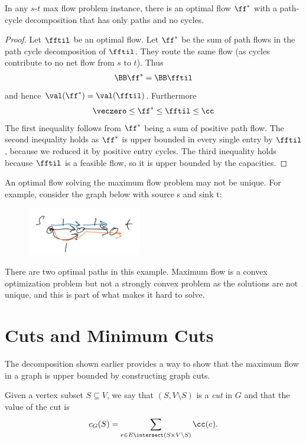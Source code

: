 \begin{lemma}
In any $s$-$t$ max flow problem instance, there is an optimal flow \(\ff^*\) with a path-cycle decomposition that has only paths and no cycles.
\end{lemma}

\begin{proof} Let \(\fftil\) be an optimal flow. Let \(\ff^*\) be the
  sum of path flows in the path cycle decomposition of
  \(\fftil\). They route the same flow (as cycles contribute to no net
  flow from $s$ to $t$). Thus
 \begin{align*}
  \BB\ff^* = \BB\fftil
 \end{align*}
 and hence $\val(\ff^*) = \val(\fftil)$.
 Furthermore
\begin{equation*}
  \veczero \leq \ff^* \leq \fftil \leq \cc
\end{equation*}
The first inequality follows from  \(\ff^*\) being a sum of positive
path flow.
The second inequality holds as $\ff^*$ is upper bounded in every single entry by \(\fftil\), because we reduced
it by positive entry cycles.
The third inequality holds because
$\fftil$ is a feasible flow, so it is upper bounded by the capacities.
\end{proof}
An optimal flow solving the maximum flow problem may not be unique.
For example, consider the graph below with source s and sink t:\\
\begin{figure}[H]
 \centering
  \includegraphics[width=50mm,scale=0.1]{fig/fig1_lec10.PNG}
  \label{fig:ex1}
\end{figure}
There are two optimal paths in this example.
Maximum flow is a convex optimization problem but not a strongly
convex problem as the solutions are not unique, and this is part of
what makes it hard to solve.

\section{Cuts and Minimum Cuts}

The decomposition shown earlier provides a way to show that the
maximum flow in a graph is upper bounded by constructing graph
cuts.

Given a vertex subset $S \subseteq V$, we say that $(S, V\setminus S)$
is a \emph{cut} in $G$ and that the value of the cut is
\[
  c_G(S) = \sum_{e \in E \intersect (S \times V\setminus S) } \cc(e)
  .
\]

